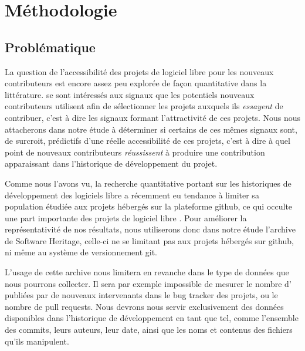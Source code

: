 \chapter{Méthodologie}

\newtheorem{hypo}{Hypothèse}
\newcommand{\newhyp}[2]{%
    \begin{restatable}{hypothesis}{#1}
        \label{hyp:#1}#2
    \end{restatable}%
}

\section{Problématique}

La question de l'accessibilité des projets de logiciel libre pour les nouveaux contributeurs est encore assez
peu explorée de façon quantitative dans la littérature. \textcite{signals-2019} se sont intéressés aux signaux
que les potentiels nouveaux contributeurs utilisent afin de sélectionner les projets auxquels ils
\emph{essayent} de contribuer, c'est à dire les signaux formant l'attractivité de ces projets. Nous nous
attacherons dans notre étude à déterminer si certains de ces mêmes signaux sont, de surcroit, prédictifs d'une
réelle accessibilité de ces projets, c'est à dire à quel point de nouveaux contributeurs \emph{réussissent} à
produire une contribution apparaissant dans l'historique de développement du projet.

Comme nous l'avons vu, la recherche quantitative portant sur les historiques de développement des logiciels
libre a récemment eu tendance à limiter sa population étudiée aux projets hébergés sur la plateforme
\gls{github}, ce qui occulte une part importante des projets de logiciel libre
\parencites{mining-github-2014}{penumbra-oss-2022}. Pour améliorer la représentativité de nos résultats, nous
utiliserons donc dans notre étude l'archive de Software Heritage, celle-ci ne se limitant pas aux projets
hébergés sur \gls{github}, ni même au système de versionnement \gls{git}.

L'usage de cette archive nous limitera en revanche dans le type de données que nous pourrons collecter. Il
sera par exemple impossible de mesurer le nombre d' publiées par de nouveaux intervenants dans le
\gls{bug tracker} des projets, ou le nombre de \glspl{pull request}. Nous devrons nous servir exclusivement
des données disponibles dans l'historique de développement en tant que tel, comme l'ensemble des
\glspl{commit}, leurs auteurs, leur date, ainsi que les noms et contenus des fichiers qu'ils manipulent.

